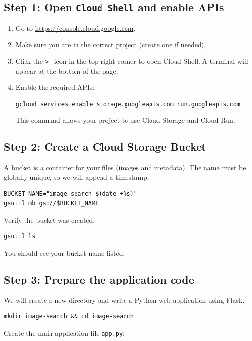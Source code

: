 \documentclass[12pt,a4paper]{article}
\begin{document}
\subsection*{Step 1: Open \texttt{Cloud Shell} and enable APIs}
\begin{enumerate}
    \item Go to \url{https://console.cloud.google.com}.
    \item Make sure you are in the correct project (create one if needed).
    \item Click the \texttt{>\_} icon in the top right corner to open Cloud Shell. A terminal will appear at the bottom of the page.
    \item Enable the required APIs:
\begin{lstlisting}
gcloud services enable storage.googleapis.com run.googleapis.com
\end{lstlisting}
    This command allows your project to use Cloud Storage and Cloud Run.
\end{enumerate}

\subsection*{Step 2: Create a Cloud Storage Bucket}
A bucket is a container for your files (images and metadata). The name must be globally unique, so we will append a timestamp.
\begin{lstlisting}
BUCKET_NAME="image-search-$(date +%s)"
gsutil mb gs://$BUCKET_NAME
\end{lstlisting}
Verify the bucket was created:
\begin{lstlisting}
gsutil ls
\end{lstlisting}
You should see your bucket name listed.

\subsection*{Step 3: Prepare the application code}
We will create a new directory and write a Python web application using Flask.

\begin{lstlisting}
mkdir image-search && cd image-search
\end{lstlisting}

Create the main application file \texttt{app.py}:
\end{document}
